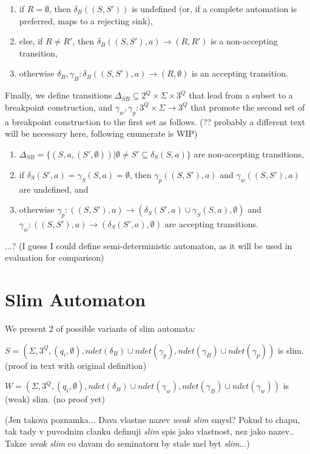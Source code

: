 \documentclass[
	digital
nolof, nolot
]{fithesis3}
\begin{document}
			\begin{enumerate}
				\item if $R=\emptyset$, then $\delta_B((S,S'))$ is undefined (or, if a complete automation is preferred, maps to a rejecting sink),
				\item else, if $R \neq R'$, then $\delta_B((S,S'),a)\rightarrow(R, R')$ is a non-accepting transition,
				\item otherwise $\delta_B, \gamma_B: \delta_B((S,S'),a)\rightarrow(R, \emptyset)$ is an accepting transition.
			\end{enumerate}
		
			Finally, we define transitions $\Delta_{SB}\subseteq 2^Q \times \Sigma \times 3^Q$ that lead from a subset to a breakpoint construction, and $\gamma_w, \gamma_p:3^Q \times \Sigma \rightarrow 3^Q$ that promote the second set of a breakpoint construction to the first set as follows. (?? probably a different text will be necessary here, following enumerate is WIP)
			
			\begin{enumerate}
				\item $\Delta_{SB}=\{(S, a, (S', \emptyset)) | \emptyset \neq S' \subseteq \delta_S(S, a)\}$ are non-accepting transitions,
				\item if $\delta_S(S',a) = \gamma_S(S, a) = \emptyset$, then $\gamma_{p}((S,S'), a)$ and $\gamma_{w}((S,S'), a)$ are undefined, and
				\item otherwise
				 $\gamma_{p}:((S,S'),a)\rightarrow(\delta_S(S',a)\cup\gamma_S(S, a),\emptyset)$ and $\gamma_{w}:((S,S'),a)\rightarrow(\delta_S(S',a),\emptyset)$ are accepting transitions.
			\end{enumerate}
		
			...? (I guess I could define semi-deterministic automaton, as it will be used in evaluation for comparison)
			\section{Slim Automaton}
			We present 2 of possible variants of slim automata:
			
			$S=(\Sigma, 3^Q, (q_i,\emptyset), ndet(\delta_B)\cup ndet(\gamma_{p}),ndet(\gamma_B)\cup ndet(\gamma_{p}))$ is slim. (proof in text with original definition)
			
			$W=(\Sigma, 3^Q, (q_i,\emptyset), ndet(\delta_B)\cup ndet(\gamma_{w}),ndet(\gamma_B)\cup ndet(\gamma_{w}))$ is (weak) slim. (no proof yet)
			
			(Jen takova poznamka... Dava vlastne nazev \emph{weak slim} smysl? Pokud to chapu, tak tady v puvodnim clanku definuji \emph{slim} spis jako vlastnost, nez jako nazev.. Takze \emph{weak slim} co davam do seminatoru by stale mel byt \emph{slim}...)
			
\end{document}
